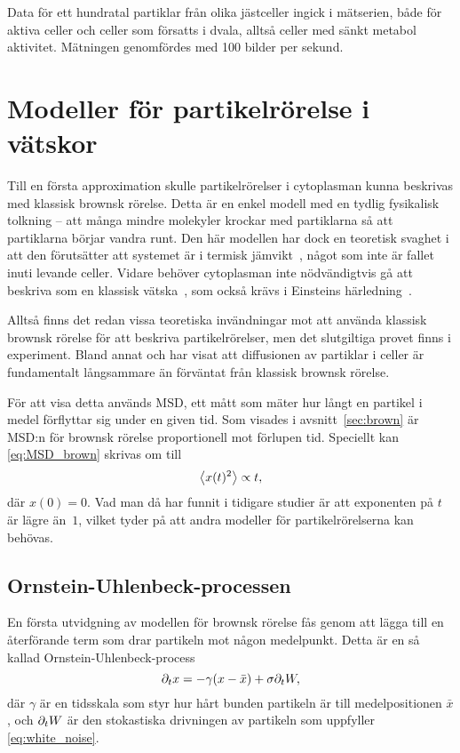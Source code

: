 Data för ett hundratal partiklar från olika jästceller ingick i mätserien, både för aktiva celler och celler som försatts i dvala, alltså celler med sänkt metabol aktivitet. Mätningen genomfördes med 100 bilder per sekund.



\section{Modeller för partikelrörelse i vätskor}

Till en första approximation skulle partikelrörelser i cytoplasman kunna beskrivas med klassisk brownsk rörelse. Detta är en enkel modell med en tydlig fysikalisk tolkning -- att många mindre molekyler krockar med partiklarna så att partiklarna börjar vandra runt. Den här modellen har dock en teoretisk svaghet i att den förutsätter att systemet är i termisk jämvikt~\cite{Einstein1905,Hofling&Franosch2013}, något som inte är fallet inuti levande celler. Vidare behöver cytoplasman inte nödvändigtvis gå att beskriva som en klassisk vätska\footnotemark{}~\cite{Midtveldt_etal2016}, som också krävs i Einsteins härledning~\cite{Einstein1905}.

Alltså finns det redan vissa teoretiska invändningar mot att använda klassisk brownsk rörelse för att beskriva partikelrörelser, men det slutgiltiga provet finns i experiment. 
Bland annat \cite{Parry_etal2014} och \cite{Midtveldt_etal2016} har visat att diffusionen av partiklar i celler är fundamentalt långsammare än förväntat från klassisk brownsk rörelse. 

För att visa detta används MSD, ett mått som mäter hur långt en partikel i medel förflyttar sig under en given tid. Som visades i avsnitt~\ref{sec:brown} är MSD:n för brownsk rörelse proportionell mot förlupen tid. Speciellt kan \eqref{eq:MSD_brown} skrivas om till
\begin{equation}
\ev{x(t)^2} \propto t,
\end{equation}
där $x(0)=0$. Vad man då har funnit i tidigare studier är att exponenten på $t$ är lägre än~$1$, vilket tyder på att andra modeller för partikelrörelserna kan behövas.


\subsection{Ornstein-Uhlenbeck-processen}
En första utvidgning av modellen för brownsk rörelse fås genom att lägga till en återförande term som drar partikeln mot någon medelpunkt. Detta är en så kallad Ornstein-Uhlenbeck-process
\begin{equation}\label{eq:SDE_o-u}
\partial_t x = -\gamma ( x-\bar{x} ) + \sigma\partial_t W,
\end{equation}
där $\gamma$ är en tidsskala som styr hur hårt bunden partikeln är till medelpositionen $\bar{x}$, och $\partial_t W$ är den stokastiska drivningen av partikeln som uppfyller \eqref{eq:white_noise}. 

